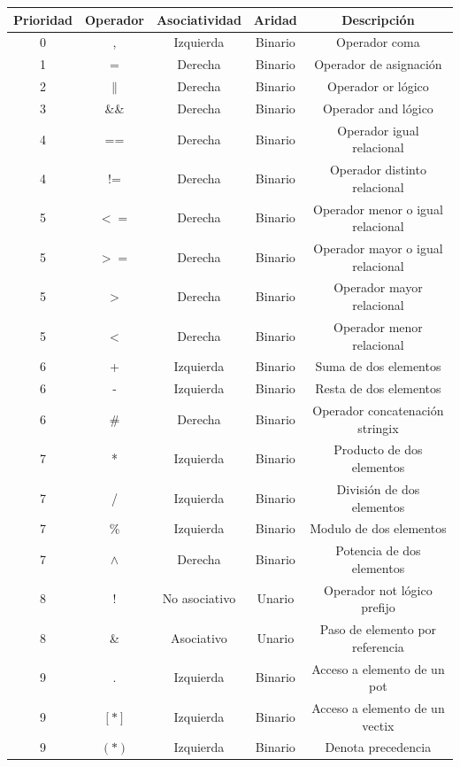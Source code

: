 \documentclass[a4paper, 10pt]{article}
\begin{document}
    \begin{table}[t]
    \begin{center}
    \begin{tabular}{| c | c | c | c | c |}
    \hline
        Prioridad & Operador & Asociatividad & Aridad & Descripción \\ \hline
        0 & , & Izquierda & Binario & Operador coma \\ \hline
        1 & $=$ & Derecha & Binario & Operador de asignación \\ \hline
        2 & $\|$ & Derecha & Binario & Operador or lógico \\ \hline
        3 & \&\& & Derecha & Binario & Operador and lógico \\ \hline
        4 & == & Derecha & Binario & Operador igual relacional \\ \hline
        4 & != & Derecha & Binario & Operador distinto relacional \\ \hline
        5 & $<=$ & Derecha & Binario & Operador menor o igual relacional \\ \hline
        5 & $>=$ & Derecha & Binario & Operador mayor o igual relacional \\ \hline
        5 & $>$ & Derecha & Binario & Operador mayor relacional \\ \hline
        5 & $<$ & Derecha & Binario & Operador menor relacional \\ \hline
        6 & + & Izquierda & Binario & Suma de dos elementos \\ \hline
        6 & - & Izquierda & Binario & Resta de dos elementos \\ \hline
        6 & \# & Derecha & Binario & Operador concatenación stringix \\ \hline
        7 & * & Izquierda & Binario & Producto de dos elementos \\ \hline
        7 & / & Izquierda & Binario & División de dos elementos \\ \hline
        7 & \% & Izquierda & Binario & Modulo de dos elementos \\ \hline
        7 & $\wedge$ & Derecha & Binario & Potencia de dos elementos \\ \hline
        8 & ! & No asociativo & Unario & Operador not lógico prefijo \\ \hline
        8 & \& & Asociativo & Unario & Paso de elemento por referencia \\ \hline
        9 & . & Izquierda & Binario & Acceso a elemento de un pot \\ \hline
        9 & $[*]$ & Izquierda & Binario & Acceso a elemento de un vectix \\ \hline
        9 & $(*)$ & Izquierda & Binario & Denota precedencia \\ \hline
        

     
    \hline
    \end{tabular}
    \end{center}
    \end{table}
\end{document}

